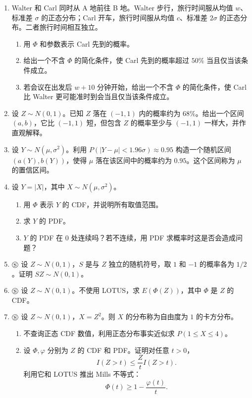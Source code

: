 \documentclass[UTF8, 12pt, fontset=fandol, oneside]{ctexart}
\begin{document}
\begin{enumerate}
  \item Walter 和 Carl 同时从 A 地前往 B 地。Walter 步行，旅行时间服从均值 $w$、标准差 $\sigma$ 的正态分布；Carl 开车，旅行时间服从均值 $c$、标准差 $2\sigma$ 的正态分布。二者旅行时间相互独立。
  \begin{enumerate}
    \item 用 $\Phi$ 和参数表示 Carl 先到的概率。
    \item 给出一个不含 $\Phi$ 的简化条件，使 Carl 先到的概率超过 $50\%$ 当且仅当该条件成立。
    \item 若会议在出发后 $w+10$ 分钟开始，给出一个不含 $\Phi$ 的简化条件，使 Carl 比 Walter 更可能准时到会当且仅当该条件成立。
  \end{enumerate}

  \item 设 $Z\sim N(0,1)$。已知 $Z$ 落在 $(-1,1)$ 内的概率约为 $68\%$。给出一个区间 $(a,b)$，它比 $(-1,1)$ 短，但包含 $Z$ 的概率至少与 $(-1,1)$ 一样大，并作直观解释。

  \item 设 $Y\sim N(\mu,\sigma^2)$。利用 $P(|Y-\mu|<1.96\sigma)\approx0.95$ 构造一个随机区间 $(a(Y),b(Y))$，使得 $\mu$ 落在该区间中的概率约为 $0.95$。这个区间称为 $\mu$ 的置信区间。

  \item 设 $Y=|X|$，其中 $X\sim N(\mu,\sigma^2)$。
  \begin{enumerate}
    \item 用 $\Phi$ 表示 $Y$ 的 CDF，并说明所有取值范围。
    \item 求 $Y$ 的 PDF。
    \item $Y$ 的 PDF 在 $0$ 处连续吗？若不连续，用 PDF 求概率时这是否会造成问题？
  \end{enumerate}

  \item $\circledS$ 设 $Z\sim N(0,1)$，$S$ 是与 $Z$ 独立的随机符号，取 $1$ 和 $-1$ 的概率各为 $1/2$。证明 $SZ\sim N(0,1)$。

  \item $\circledS$ 设 $Z\sim N(0,1)$。不使用 LOTUS，求 $E(\Phi(Z))$，其中 $\Phi$ 是 $Z$ 的 CDF。

  \item $\circledS$ 设 $Z\sim N(0,1)$，$X=Z^2$。则 $X$ 的分布称为自由度为 $1$ 的卡方分布。
  \begin{enumerate}
    \item 不查询正态 CDF 数值，利用正态分布事实近似求 $P(1\le X\le4)$。
    \item 设 $\Phi,\varphi$ 分别为 $Z$ 的 CDF 和 PDF。证明对任意 $t>0$，
    \[
      I(Z>t)\le \frac{Z}{t}I(Z>t).
    \]
    利用它和 LOTUS 推出 Mills 不等式：
    \[
      \Phi(t)\ge 1-\frac{\varphi(t)}{t}.
    \]
  \end{enumerate}


\end{enumerate}
\end{document}
